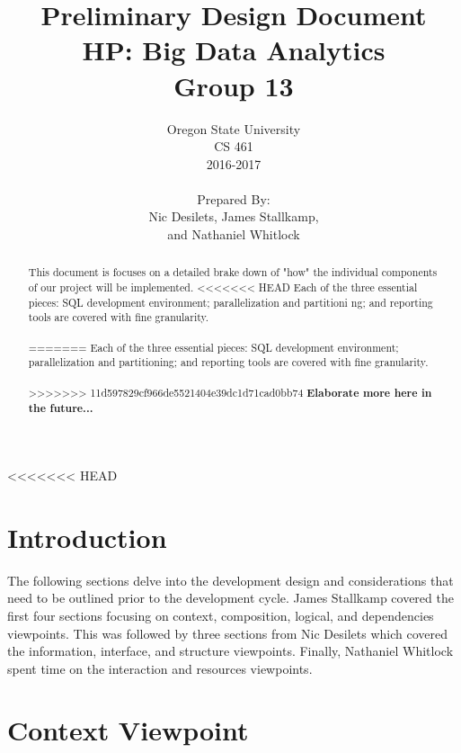 \documentclass[draftclsnofoot, onecolumn, compsoc, 10pt]{IEEEtran}
\title{\Huge Preliminary Design Document\\\large HP: Big Data Analytics\\Group 13}
\author{Oregon State University\\CS 461\\2016-2017\\\\Prepared By:\\Nic Desilets, James Stallkamp,\\and Nathaniel Whitlock}
\begin{document}
\begin{titlingpage}
    \maketitle 
    
    \vspace{1in}
    \begin{abstract}
		\noindent This document is focuses on a detailed brake down of "how" the individual components of our project will be implemented.
<<<<<<< HEAD
        Each of the three essential pieces: SQL development environment; parallelization and partitioni ng; and reporting tools are covered with fine granularity.\\\\
=======
        Each of the three essential pieces: SQL development environment; parallelization and partitioning; and reporting tools are covered with fine granularity.\\\\
>>>>>>> 11d597829cf966de5521404e39dc1d71cad0bb74
        \textbf{Elaborate more here in the future...}
        
    \end{abstract}
\end{titlingpage}

{\small\tableofcontents} %
<<<<<<< HEAD
\pagebreak

\section{Introduction}
The following sections delve into the development design and considerations that need to be outlined prior to the development cycle.
James Stallkamp covered the first four sections focusing on context, composition, logical, and dependencies viewpoints.
This was followed by three sections from Nic Desilets which covered the information, interface, and structure viewpoints.
Finally, Nathaniel Whitlock spent time on the interaction and resources viewpoints.


\section{Context Viewpoint}
\end{document}
